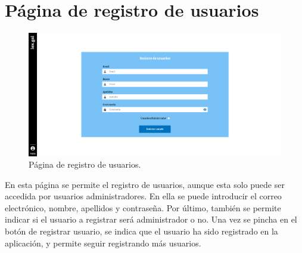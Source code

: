 \section{Página de registro de usuarios}
\label{PRegistroUsuarios}

\begin{figure}[H]
\centerline{\includegraphics[width=12cm]{figuras/manualUsuario/RegistroUsuario.PNG}}
\caption{Página de registro de usuarios.}
\label{enlacePRegistroUsuarios}
\end{figure}

En esta página se permite el registro de usuarios, aunque esta solo puede ser accedida por usuarios administradores. En ella se puede introducir el correo electrónico, nombre, apellidos y contraseña. Por último, también se permite indicar si el usuario a registrar será administrador o no. Una vez se pincha en el botón de registrar usuario, se indica que el usuario ha sido registrado en la aplicación, y permite seguir registrando más usuarios.